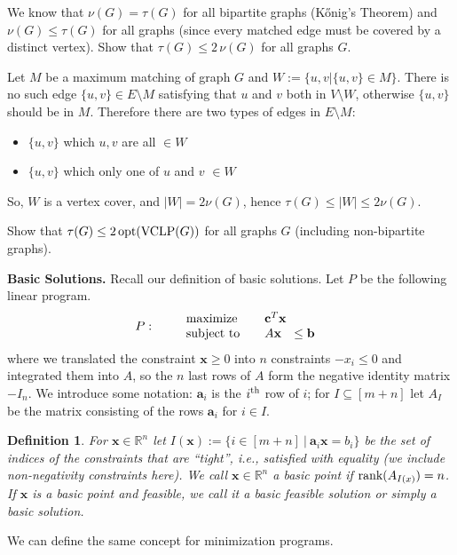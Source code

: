 \documentclass[11pt,a4paper,oneside]{article}
\newtheorem{definition}[theorem]{Definition}
\newcommand{\nth}[1]{#1\textsuperscript{th}}
\newcommand{\R}{\mathbb{R}}
\newcommand{\x}{\mathbf{x}}
\newcommand{\opt}{\textup{\textrm{opt}}}
\newcommand{\rank}{\textnormal{rank}}
\renewcommand{\a}{\mathbf{a}}
\renewcommand{\b}{\mathbf{b}}
\begin{document}
\begin{problem}{2}
  \statement
 We know that $\nu(G) = \tau(G)$ for all bipartite graphs (K\H{o}nig's Theorem) and
 $\nu(G) \leq \tau(G)$ for all graphs (since every matched edge must be covered
 by a distinct vertex). Show that $\tau(G) \leq 2 \, \nu(G)$ for all graphs $G$.   
  
  \solution
  
  Let \(M\) be a maximum matching of graph \(G\) and \(W := \{u, v | \{u, v\} \in M\}\). There is no such edge \(\{u, v\} \in E \setminus M\) satisfying that \(u\) and \(v\) both in \(V \setminus W\), otherwise \(\{u, v\}\) should be in \(M\). Therefore there are two types of edges in \(E \setminus M\):
  
  \begin{itemize}
  	\item \(\{u, v\}\) which \(u, v\) are all \(\in W\)
  	\item \(\{u, v\}\) which only one of \(u\) and \(v\) \(\in W\)
  \end{itemize}

	So, \(W\) is a vertex cover, and \(|W| = 2\nu(G)\), hence \(\tau(G) \leq |W| \leq 2\nu(G)\).
\end{problem}


\begin{problem}{3}
	\statement
     Show that $\tau(G) \leq 2\, \opt(\textrm{VCLP}(G))$ for all graphs $G$ (including non-bipartite graphs).
  
    \solution
    
\end{problem}



\textbf{Basic Solutions.} Recall our definition of basic solutions.
Let $P$ be the following linear program.
\begin{align*}
P: \qquad
\begin{array}{lrl}
\textnormal{maximize} \quad & \multicolumn{2}{l}{\mathbf{c}^T \x} \\
\textnormal{subject to} \quad & A\x & \leq \b \ 
\end{array}
\end{align*}
where we translated the constraint $\x \geq 0$ into $n$ constraints
$-x_i \leq 0$ and integrated them into $A$, so 
the $n$ last rows of $A$ form the 
negative identity matrix $-I_n$. We introduce some notation: $\a_i$ is the $\nth{i}$ row of $i$;
for $I \subseteq [m+n]$ let $A_I$ be the matrix
consisting of the rows $\a_i$ for $i \in I$.
\begin{definition}
	For $\x \in \R^n$ let $I(\x) := \{i \in [m+n] \ | \ \a_i \x = b_i\}$
	be the set of indices of the constraints that are ``tight'', i.e.,
	satisfied with equality (we include non-negativity constraints here).  We call $\x \in \R^n$ a {\em basic point}
	if $\rank(A_{I(x)}) = n$.  If $\x$ is a basic point and feasible, we
	call it a {\em basic feasible solution} or simply a {\em basic
		solution}.
\end{definition}
We can define the same concept for minimization programs. \\
\end{document}
